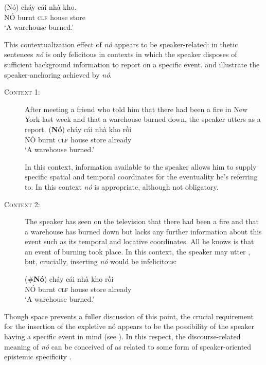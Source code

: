 \documentclass[output=paper]{LSP/langsci}
\begin{document}
\ea%
    \label{ex:Greco:15}
    \gll (Nó)    cháy  cái  nhà  kho.\\
         NÓ     burnt      \textsc{clf}    house    store\\
    \glt      ‘A warehouse burned.’
\z

This contextualization effect of \textit{nó} appears to be speaker-related: in thetic sentences\textit{ nó} is only felicitous in contexts in which the speaker disposes of sufficient background information to report on a specific event.  and  illustrate the speaker-anchoring achieved by \textit{nó}.

\begin{description}
\item[\textsc{Context} 1:\\]
After meeting a friend who told him that there had been a fire in New York last week and that a warehouse burned down, the speaker utters  as a report.
\ea%
    \label{ex:Greco:16}
    \gll (\textbf{Nó})  cháy  cái  nhà  kho   rồi\\
	NÓ  burnt  \textsc{clf}  house  store   already\\
    \glt ‘A warehouse burned.’
    \z

In this context, information available to the speaker allows him to supply specific spatial and temporal coordinates for the eventuality he’s referring to. In this context \textit{nó} is appropriate, although not obligatory.

\item[\textsc{Context} 2:\\]
The speaker has seen on the television that there had been a fire and that a warehouse has burned down but lacks any further information about this event such as its temporal and locative coordinates. All he knows is that an event of burning took place. In this context, the speaker may utter , but, crucially, inserting \textit{nó} would be infelicitous:

\ea%
    \label{ex:Greco:17}
    \gll (\#\textbf{Nó})  cháy  cái  nhà  kho   rồi\\
	NÓ  burnt  \textsc{clf}  house  store   already\\
    \glt ‘A warehouse burned.’
\z
\end{description}

Though space prevents a fuller discussion of this point, the crucial requirement for the insertion of the expletive nó appears to be the possibility of the speaker having a specific event in mind (see \citealt{GrecoEtAltoappear}). In this respect, the discourse-related meaning of \textit{nó} can be conceived of as related to some form of speaker-oriented epistemic specificity \citep{Hellan1981,Farkas2002}.
\end{document}

